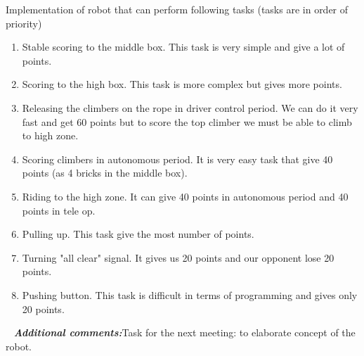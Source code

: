 \begin{enumerate*}
\begin{enumerate}
\begin{enumerate}
		\end{enumerate}
	\end{enumerate}
	\item Implementation of robot that can perform following tasks (tasks are in order of priority)
	\begin{enumerate}
		\item Stable scoring to the middle box. This task is very simple and give a lot of points.
		\item Scoring to the high box. This task is more complex but gives more points.
		\item Releasing the climbers on the rope in driver control period. We can do it very fast and get 60 points but to score the top climber we must be able to climb to high zone.
		\item Scoring climbers in autonomous period. It is very easy task that give 40 points (as 4 bricks in the middle box).
		\item Riding to the high zone. It can give 40 points in autonomous period and 40 points in tele op.
		\item Pulling up. This task give the most number of points.
		\item Turning "all clear" signal. It gives us 20 points and our opponent lose 20 points.
		\item Pushing button. This task is difficult in terms of programming and gives only 20 points.
	\end{enumerate}
	
	 \newline
	\textit{\textbf{Additional comments:}}Task for the next meeting: to elaborate concept of the robot.
	
\end{enumerate*}





\fillpage
